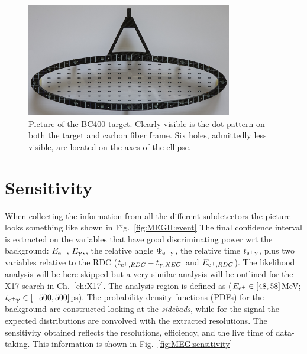 \begin{refsection}
        \begin{figure}
            \centering
            \includegraphics[width = 0.8\textwidth]{Figures/MEG/meg_target.png}
            \caption{Picture of the BC400 target. Clearly visible is the dot pattern on both the target and carbon fiber frame. Six holes, admittedly less visible, are located on the axes of the ellipse.}
            \label{fig:meg:target}
        \end{figure}

\section{Sensitivity}  
    When collecting the information from all the different subdetectors the picture looks something like shown in Fig.~\ref{fig:MEGII:event}
    The final confidence interval is extracted on the variables that have good discriminating power wrt the background: $E_{\text{e}^+}$, $E_\upgamma,$, the relative angle $\Phi_{\text{e}^+\upgamma}$, the relative time $t_{\text{e}^+\upgamma}$, plus two variables relative to the RDC ($t_{\text{e}^+, RDC}-t_{\upgamma, XEC}$ and $E_{\text{e}^+, RDC}$).
    The likelihood analysis will be here skipped but a very similar analysis will be outlined for the X17 search in Ch.~\ref{ch:X17}.
    The analysis region is defined as ($E_{\text{e}^+}\in[48,58]$MeV; $t_{\text{e}^+\upgamma}\in[-500,500]$ps).
    The probability density functions (PDFs) for the background are constructed looking at the \textit{sidebads}, while for the signal the expected distributions are convolved with the extracted resolutions.
    The sensitivity obtained reflects the resolutions, efficiency, and the live time of data-taking. 
    This information is shown in Fig.~\ref{fig:MEG:sensitivity}
    

\end{refsection}
